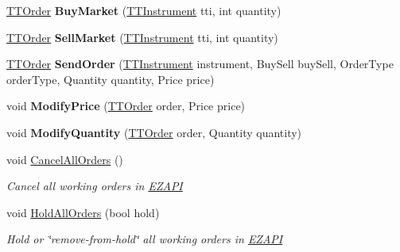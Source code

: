 \begin{DoxyCompactItemize}
\item 
\hypertarget{class_e_z_a_p_i_1_1_t_t_a_p_i_functions_a2ae9ccf7bb7ba094d0418d4cab641e9c}{\hyperlink{class_e_z_a_p_i_1_1_containers_1_1_t_t_order}{T\-T\-Order} {\bfseries Buy\-Market} (\hyperlink{class_e_z_a_p_i_1_1_containers_1_1_t_t_instrument}{T\-T\-Instrument} tti, int quantity)}\label{class_e_z_a_p_i_1_1_t_t_a_p_i_functions_a2ae9ccf7bb7ba094d0418d4cab641e9c}

\item 
\hypertarget{class_e_z_a_p_i_1_1_t_t_a_p_i_functions_a801e23230e1eb63a6d6e5ebf8ce56109}{\hyperlink{class_e_z_a_p_i_1_1_containers_1_1_t_t_order}{T\-T\-Order} {\bfseries Sell\-Market} (\hyperlink{class_e_z_a_p_i_1_1_containers_1_1_t_t_instrument}{T\-T\-Instrument} tti, int quantity)}\label{class_e_z_a_p_i_1_1_t_t_a_p_i_functions_a801e23230e1eb63a6d6e5ebf8ce56109}

\item 
\hypertarget{class_e_z_a_p_i_1_1_t_t_a_p_i_functions_a583a99adc65f93a779d4527edad310ce}{\hyperlink{class_e_z_a_p_i_1_1_containers_1_1_t_t_order}{T\-T\-Order} {\bfseries Send\-Order} (\hyperlink{class_e_z_a_p_i_1_1_containers_1_1_t_t_instrument}{T\-T\-Instrument} instrument, Buy\-Sell buy\-Sell, Order\-Type order\-Type, Quantity quantity, Price price)}\label{class_e_z_a_p_i_1_1_t_t_a_p_i_functions_a583a99adc65f93a779d4527edad310ce}

\item 
\hypertarget{class_e_z_a_p_i_1_1_t_t_a_p_i_functions_abf364743c983eb27b0bda16d5cc73827}{void {\bfseries Modify\-Price} (\hyperlink{class_e_z_a_p_i_1_1_containers_1_1_t_t_order}{T\-T\-Order} order, Price price)}\label{class_e_z_a_p_i_1_1_t_t_a_p_i_functions_abf364743c983eb27b0bda16d5cc73827}

\item 
\hypertarget{class_e_z_a_p_i_1_1_t_t_a_p_i_functions_a71e548aa8b357af607049b69440ccde2}{void {\bfseries Modify\-Quantity} (\hyperlink{class_e_z_a_p_i_1_1_containers_1_1_t_t_order}{T\-T\-Order} order, Quantity quantity)}\label{class_e_z_a_p_i_1_1_t_t_a_p_i_functions_a71e548aa8b357af607049b69440ccde2}

\item 
void \hyperlink{class_e_z_a_p_i_1_1_t_t_a_p_i_functions_ab2894b181243235acab3e9ad2d05145d}{Cancel\-All\-Orders} ()
\begin{DoxyCompactList}\small\item\em Cancel all working orders in \hyperlink{namespace_e_z_a_p_i}{E\-Z\-A\-P\-I} \end{DoxyCompactList}\item 
void \hyperlink{class_e_z_a_p_i_1_1_t_t_a_p_i_functions_ad64dab6312a4c8f952e76dcbce260e46}{Hold\-All\-Orders} (bool hold)
\begin{DoxyCompactList}\small\item\em Hold or \char`\"{}remove-\/from-\/hold\char`\"{} all working orders in \hyperlink{namespace_e_z_a_p_i}{E\-Z\-A\-P\-I} \end{DoxyCompactList}\end{DoxyCompactItemize}
